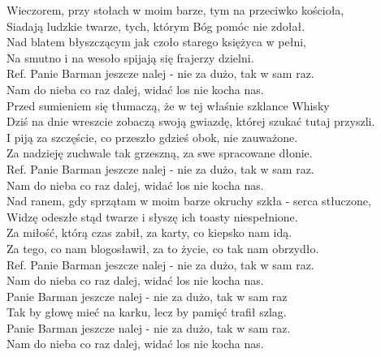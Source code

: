 
\begin{flushleft}
\vskip 3mm
Wieczorem, przy stołach w moim barze, tym na przeciwko kościoła, \\
Siadają ludzkie twarze, tych, którym Bóg pomóc nie zdołał. \tab{} \\
Nad blatem błyszczącym jak czoło starego księżyca w pełni,\tab{} \\
Na smutno i na wesoło spijają się frajerzy dzielni. \tab{}\\
\vskip 3mm
Ref. Panie Barman jeszcze nalej - nie za dużo, tak w sam raz. \tab{}\\
\hspace{0.9cm}Nam do nieba co raz dalej, widać los nie kocha nas.\tab{} \\
\tab{}\tab{}\tab{}
\vskip 3mm 
Przed sumieniem się tłumaczą, że w tej właśnie szklance Whisky \\
Dziś na dnie wreszcie zobaczą swoją gwiazdę, której szukać tutaj przyszli. \\
I piją za szczęście, co przeszło gdzieś obok, nie zauważone. \\
Za nadzieję zuchwale tak grzeszną, za swe spracowane dłonie. \\
\vskip 3mm
Ref. Panie Barman jeszcze nalej - nie za dużo, tak w sam raz. \\
\hspace{0.9cm}Nam do nieba co raz dalej, widać los nie kocha nas. \\
\vskip 3mm
Nad ranem, gdy sprzątam w moim barze okruchy szkła - serca stłuczone, \\
Widzę odeszłe stąd twarze i słyszę ich toasty niespełnione. \\
Za miłość, którą czas zabił, za karty, co kiepsko nam idą. \\
Za tego, co nam blogosławił, za to życie, co tak nam obrzydło. \\
\vskip 3mm
Ref. Panie Barman jeszcze nalej - nie za dużo, tak w sam raz. \\
\hspace{0.9cm}Nam do nieba co raz dalej, widać los nie kocha nas. \\
\hspace{0.9cm}Panie Barman jeszcze nalej - nie za dużo, tak w sam raz \\
\hspace{0.9cm}Tak by głowę mieć na karku, lecz by pamięć trafił szlag. \\
\hspace{0.9cm}Panie Barman jeszcze nalej - nie za dużo, tak w sam raz. \\
\hspace{0.9cm}Nam do nieba co raz dalej, widać los nie kocha nas. \\

\vskip 3mm
\end{flushleft}
\clearpage
